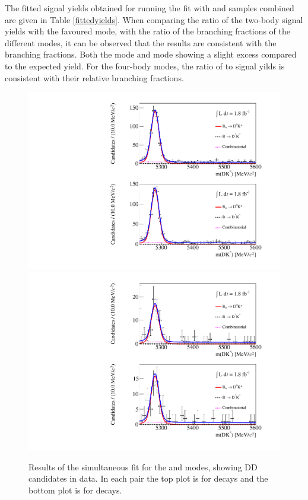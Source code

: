 The fitted signal yields obtained for running the fit with \Bp and \Bm samples combined are given in Table \ref{fittedyields}. When comparing the ratio of the two-body signal yields with the favoured mode, with the ratio of the branching fractions of the different \Dz modes, it can be observed that the results are consistent with the branching fractions. Both the \kk mode and \pik mode showing a slight excess compared to the expected yield. For the four-body modes, the ratio of \kpipipi to \pipipipi signal yilds is consistent with their relative branching fractions.

\begin{figure}
\includegraphics[width=0.5\linewidth]{figures/results/canvas_d2kpi_DD_run2.pdf}
\includegraphics[width=0.5\linewidth]{figures/results/canvas_d2kk_DD_run2.pdf}
\caption{Results of the simultaneous fit for the \kpi and \kk modes, showing DD candidates in \runtwo data. In each pair the top plot is for \Bp decays and the bottom plot is for \Bm decays.}
\label{resultskpi}
\end{figure}

